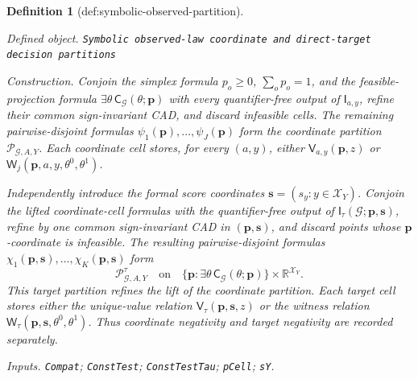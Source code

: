 \documentclass{article}
\newtheorem{definition}{Definition}
\begin{document}
\begin{definition}[def:symbolic-observed-partition]\label{def:symbolic-observed-partition}
\par\smallskip\noindent\emph{Defined object.} \texttt{Symbolic observed-\allowbreak{}law coordinate and direct-\allowbreak{}target decision partitions}
\par\smallskip\noindent\emph{Construction.} Conjoin the simplex formula \(p_o\geq0\), \(\sum_op_o=1\), and the feasible-projection formula \(\exists\theta\,\mathsf C_{\mathcal G}(\theta;\mathbf p)\) with every quantifier-free output of \(\mathsf I_{a,y}\), refine their common sign-invariant CAD, and discard infeasible cells. The remaining pairwise-disjoint formulas \(\psi_1(\mathbf p),\ldots,\psi_J(\mathbf p)\) form the coordinate partition \(\mathscr P_{\mathcal G,A,Y}\). Each coordinate cell stores, for every \((a,y)\), either \(\mathsf V_{a,y}(\mathbf p,z)\) or \(\mathsf W_j(\mathbf p,a,y,\theta^0,\theta^1)\).

Independently introduce the formal score coordinates \(\mathbf s=(s_y:y\in\mathcal X_Y)\). Conjoin the lifted coordinate-cell formulas with the quantifier-free output of \(\mathsf I_{\tau}(\mathcal G;\mathbf p,\mathbf s)\), refine by one common sign-invariant CAD in \((\mathbf p,\mathbf s)\), and discard points whose \(\mathbf p\)-coordinate is infeasible. The resulting pairwise-disjoint formulas \(\chi_1(\mathbf p,\mathbf s),\ldots,\chi_K(\mathbf p,\mathbf s)\) form
\[
\mathscr P^{\tau}_{\mathcal G,A,Y}
\quad\text{on}\quad
\{\mathbf p:\exists\theta\,\mathsf C_{\mathcal G}(\theta;\mathbf p)\}
\times\mathbb R^{\mathcal X_Y}.
\]
This target partition refines the lift of the coordinate partition. Each target cell stores either the unique-value relation \(\mathsf V_{\tau}(\mathbf p,\mathbf s,z)\) or the witness relation \(\mathsf W_{\tau}(\mathbf p,\mathbf s,\theta^0,\theta^1)\). Thus coordinate negativity and target negativity are recorded separately.
\par\smallskip\noindent\emph{Inputs.} \texttt{Compat}; \texttt{ConstTest}; \texttt{ConstTestTau}; \texttt{pCell}; \texttt{sY}.
\end{definition}
\end{document}
